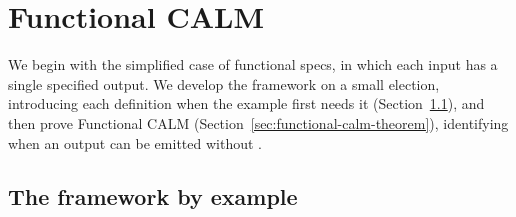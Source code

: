 \section{Functional CALM}
\label{sec:functional-calm}

We begin with the simplified case of functional specs, in which each input has a
single specified output.  We develop the framework on a small election,
introducing each definition when the example first needs it
(Section~\ref{sec:election-story}), and then prove Functional CALM
(Section~\ref{sec:functional-calm-theorem}), identifying when an output can be
emitted without \commitment.

\subsection{The framework by example}
\label{sec:election-story}
\label{sec:functional-specifications}
\label{sec:functional-events}
\label{sec:executions}

